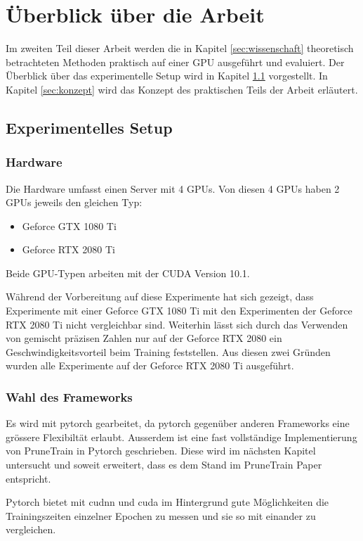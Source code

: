 \chapter{Überblick über die Arbeit}\label{sec:experimente}
Im zweiten Teil dieser Arbeit werden die in Kapitel \ref{sec:wissenschaft} theoretisch betrachteten Methoden praktisch auf einer GPU ausgeführt und evaluiert. Der Überblick über das experimentelle Setup wird in Kapitel \ref{sec:setup} vorgestellt. In Kapitel \ref{sec:konzept} wird das Konzept des praktischen Teils der Arbeit erläutert.

\section{Experimentelles Setup}\label{sec:setup}
\subsection{Hardware}
Die Hardware umfasst einen Server mit 4 GPUs.
Von diesen 4 GPUs haben 2 GPUs jeweils den gleichen Typ:
\begin{itemize}
 \item Geforce GTX 1080 Ti
 \item Geforce RTX 2080 Ti 
\end{itemize}

Beide GPU-Typen arbeiten mit der CUDA Version 10.1. 

Während der Vorbereitung auf diese Experimente hat sich gezeigt, dass Experimente mit einer Geforce GTX 1080 Ti mit den Experimenten der Geforce RTX 2080 Ti nicht vergleichbar sind. Weiterhin lässt sich durch das Verwenden von gemischt präzisen Zahlen nur auf der Geforce RTX 2080 ein Geschwindigkeitsvorteil beim Training feststellen. Aus diesen zwei Gründen wurden alle Experimente auf der Geforce RTX 2080 Ti ausgeführt.  


\subsection{Wahl des Frameworks}

Es wird mit pytorch gearbeitet, da pytorch gegenüber anderen Frameworks eine grössere Flexibiltät erlaubt. Ausserdem ist eine fast vollständige Implementierung von PruneTrain in Pytorch geschrieben. Diese wird im nächsten Kapitel untersucht und soweit erweitert, dass es dem Stand im PruneTrain Paper entspricht.

Pytorch bietet mit cudnn und cuda im Hintergrund gute Möglichkeiten die Trainingszeiten einzelner Epochen zu messen und sie so mit einander zu vergleichen.


